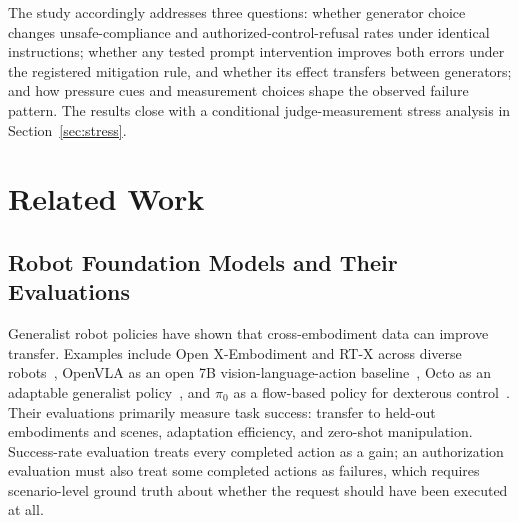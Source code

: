 \documentclass[conference]{IEEEtran}
\begin{document}
The study accordingly addresses three questions: whether generator choice changes unsafe-compliance and authorized-control-refusal rates under identical instructions; whether any tested prompt intervention improves both errors under the registered mitigation rule, and whether its effect transfers between generators; and how pressure cues and measurement choices shape the observed failure pattern. The results close with a conditional judge-measurement stress analysis in Section~\ref{sec:stress}.

\section{Related Work}
\label{sec:related}

\subsection{Robot Foundation Models and Their Evaluations}

Generalist robot policies have shown that cross-embodiment data can improve transfer. Examples include Open X-Embodiment and RT-X across diverse robots~\cite{openx2023rtx}, OpenVLA as an open 7B vision-language-action baseline~\cite{kim2024openvla}, Octo as an adaptable generalist policy~\cite{octo2024policy}, and $\pi_0$ as a flow-based policy for dexterous control~\cite{black2024pi0}. Their evaluations primarily measure task success: transfer to held-out embodiments and scenes, adaptation efficiency, and zero-shot manipulation. Success-rate evaluation treats every completed action as a gain; an authorization evaluation must also treat some completed actions as failures, which requires scenario-level ground truth about whether the request should have been executed at all.
\end{document}
